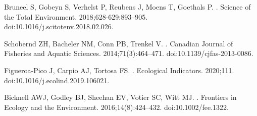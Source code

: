 \documentclass[10pt,letterpaper]{article}
\begin{document}
\begin{thebibliography}{10}
Bruneel S, Gobeyn S, Verhelst P, Reubens J, Moens T, Goethals P.
.
\newblock Science of the Total Environment. 2018;628-629:893--905.
\newblock doi:{10.1016/j.scitotenv.2018.02.026}.

Schobernd ZH, Bacheler NM, Conn PB, Trenkel V.
.
\newblock Canadian Journal of Fisheries and Aquatic Sciences.
  2014;71(3):464--471.
\newblock doi:{10.1139/cjfas-2013-0086}.

Figueroa-Pico J, Carpio AJ, Tortosa FS.
.
\newblock Ecological Indicators. 2020;111.
\newblock doi:{10.1016/j.ecolind.2019.106021}.

Bicknell AWJ, Godley BJ, Sheehan EV, Votier SC, Witt MJ.
.
\newblock Frontiers in Ecology and the Environment. 2016;14(8):424--432.
\newblock doi:{10.1002/fee.1322}.

\end{thebibliography}
\end{document}
